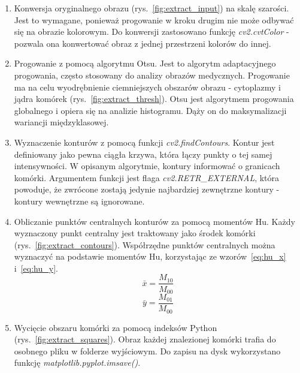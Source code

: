 \begin{enumerate}
    \item Konwersja oryginalnego obrazu (rys.~\ref{fig:extract_input}) na skalę szarości.
    Jest to wymagane, ponieważ progowanie w kroku drugim nie może odbywać się na obrazie kolorowym.
    Do konwersji zastosowano funkcję \textit{cv2.cvtColor} - pozwala ona konwertować obraz z jednej przestrzeni kolorów do innej.
    \item Progowanie z pomocą algorytmu Otsu.
    Jest to algorytm adaptacyjnego progowania, często stosowany do analizy obrazów medycznych.
    Progowanie ma na celu wyodrębnienie ciemniejszych obszarów obrazu - cytoplazmy i jądra komórek (rys.~\ref{fig:extract_thresh}). Otsu jest algorytmem progowania globalnego i opiera się na analizie histogramu.
    Dąży on do maksymalizacji wariancji międzyklasowej.
    \item Wyznaczenie konturów z pomocą funkcji \textit{cv2.findContours}.
    Kontur jest definiowany jako pewna ciągła krzywa, która łączy punkty o tej samej intensywności.
    W opisanym algorytmie, kontury informować o granicach komórki.
    Argumentem funkcji jest flaga \textit{cv2.RETR\_EXTERNAL}, która powoduje, że zwrócone zostają jedynie najbardziej zewnętrzne kontury - kontury wewnętrzne są ignorowane.
    \item Obliczanie punktów centralnych konturów za pomocą momentów Hu. Każdy wyznaczony punkt centralny jest traktowany jako środek komórki (rys.~\ref{fig:extract_contours}).
    Współrzędne punktów centralnych można wyznaczyć na podstawie momentów Hu, korzystając ze wzorów~\ref{eq:hu_x} i~\ref{eq:hu_y}.
    \begin{equation}
        \bar{x} = \dfrac{M_{10}}{M_{00}}\label{eq:hu_x}
    \end{equation}
    \begin{equation}
        \bar{y} = \dfrac{M_{01}}{M_{00}}\label{eq:hu_y}
    \end{equation}
    \item Wycięcie obszaru komórki za pomocą indeksów Python (rys.~\ref{fig:extract_squares}). Obraz każdej znalezionej komórki trafia do osobnego pliku w folderze wyjściowym.
    Do zapisu na dysk wykorzystano funkcję \textit{matplotlib.pyplot.imsave()}.
\end{enumerate}
